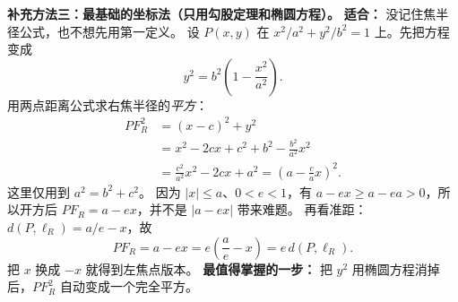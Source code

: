 \clearpage
\begin{proofbox}
\textbf{补充方法三：最基础的坐标法（只用勾股定理和椭圆方程）。}
\textbf{适合：} 没记住焦半径公式，也不想先用第一定义。
设 $P(x,y)$ 在 $x^2/a^2+y^2/b^2=1$ 上。先把方程变成
\[
y^2=b^2\left(1-\frac{x^2}{a^2}\right).
\]
用两点距离公式求右焦半径的\emph{平方}：
\[
\begin{aligned}
PF_R^2&=(x-c)^2+y^2\\
&=x^2-2cx+c^2+b^2-\frac{b^2}{a^2}x^2\\
&=\frac{c^2}{a^2}x^2-2cx+a^2
=\left(a-\frac ca x\right)^2.
\end{aligned}
\]
这里仅用到 $a^2=b^2+c^2$。
因为 $|x|\le a$、$0<e<1$，有 $a-ex\ge a-ea>0$，所以开方后
$PF_R=a-ex$，并不是 $|a-ex|$ 带来难题。
再看准距：$d(P,\ell_R)=a/e-x$，故
\[
PF_R=a-ex=e\left(\frac ae-x\right)=e\,d(P,\ell_R).
\]
把 $x$ 换成 $-x$ 就得到左焦点版本。
\textbf{最值得掌握的一步：} 把 $y^2$ 用椭圆方程消掉后，$PF_R^2$ 自动变成一个完全平方。
\end{proofbox}

